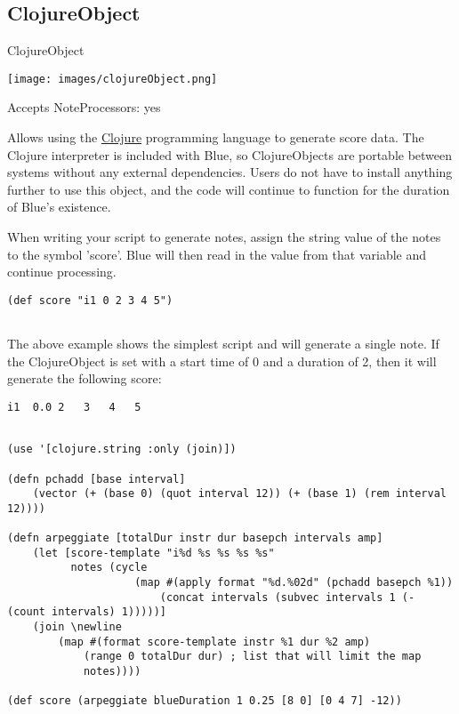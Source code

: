 \subsection{ClojureObject}\label{clojureObject}

ClojureObject

\texttt{[image: images/clojureObject.png]}

Accepts NoteProcessors: yes

Allows using the \href{http://www.clojure.org}{Clojure} programming
language to generate score data. The Clojure interpreter is included
with Blue, so ClojureObjects are portable between systems without any
external dependencies. Users do not have to install anything further to
use this object, and the code will continue to function for the duration
of Blue's existence.

When writing your script to generate notes, assign the string value of
the notes to the symbol 'score'. Blue will then read in the value from
that variable and continue processing.

\begin{verbatim}
(def score "i1 0 2 3 4 5")
    
\end{verbatim}

The above example shows the simplest script and will generate a single
note. If the ClojureObject is set with a start time of 0 and a duration
of 2, then it will generate the following score:

\begin{verbatim}
i1  0.0 2   3   4   5
    
\end{verbatim}

\begin{verbatim}
(use '[clojure.string :only (join)])

(defn pchadd [base interval] 
    (vector (+ (base 0) (quot interval 12)) (+ (base 1) (rem interval 12))))

(defn arpeggiate [totalDur instr dur basepch intervals amp]
    (let [score-template "i%d %s %s %s %s"
          notes (cycle 
                    (map #(apply format "%d.%02d" (pchadd basepch %1)) 
                        (concat intervals (subvec intervals 1 (- (count intervals) 1)))))]
    (join \newline
        (map #(format score-template instr %1 dur %2 amp) 
            (range 0 totalDur dur) ; list that will limit the map
            notes))))

(def score (arpeggiate blueDuration 1 0.25 [8 0] [0 4 7] -12))
    
\end{verbatim}

